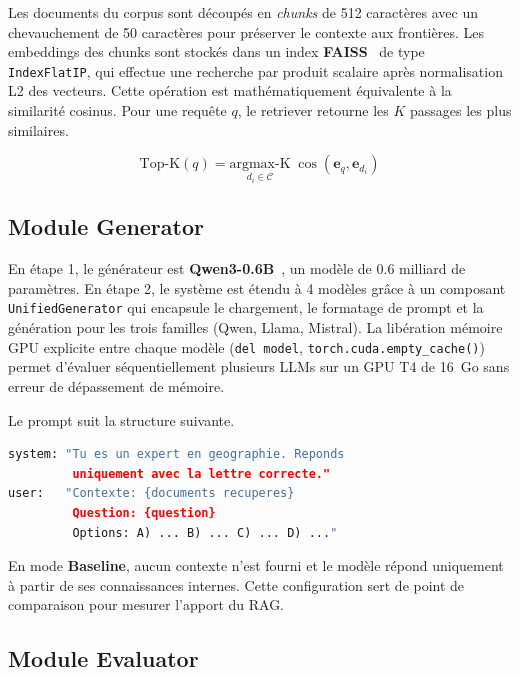 \documentclass[12pt,a4paper]{article}
\begin{document}
Les documents du corpus sont d\'ecoup\'es en \textit{chunks} de 512 caract\`eres avec un chevauchement de 50 caract\`eres pour pr\'eserver le contexte aux fronti\`eres. Les embeddings des chunks sont stock\'es dans un index \textbf{FAISS}~\cite{johnson2019faiss} de type \texttt{IndexFlatIP}, qui effectue une recherche par produit scalaire apr\`es normalisation L2 des vecteurs. Cette op\'eration est math\'ematiquement \'equivalente \`a la similarit\'e cosinus. Pour une requ\^ete $q$, le retriever retourne les $K$ passages les plus similaires.

\begin{equation}
  \text{Top-K}(q) = \underset{d_i \in \mathcal{C}}{\text{argmax-K}} \; \cos(\mathbf{e}_q, \mathbf{e}_{d_i})
\end{equation}

\subsection{Module Generator}

En \'etape 1, le g\'en\'erateur est \textbf{Qwen3-0.6B}~\cite{yang2025qwen3}, un mod\`ele de 0.6 milliard de param\`etres. En \'etape 2, le syst\`eme est \'etendu \`a 4 mod\`eles gr\^ace \`a un composant \texttt{UnifiedGenerator} qui encapsule le chargement, le formatage de prompt et la g\'en\'eration pour les trois familles (Qwen, Llama, Mistral). La lib\'eration m\'emoire GPU explicite entre chaque mod\`ele (\texttt{del model}, \texttt{torch.cuda.empty\_cache()}) permet d'\'evaluer s\'equentiellement plusieurs LLMs sur un GPU T4 de 16~Go sans erreur de d\'epassement de m\'emoire.

Le prompt suit la structure suivante.

\begin{lstlisting}[language=Python, caption={Prompt template pour le mode RAG}]
system: "Tu es un expert en geographie. Reponds
         uniquement avec la lettre correcte."
user:   "Contexte: {documents recuperes}
         Question: {question}
         Options: A) ... B) ... C) ... D) ..."
\end{lstlisting}

En mode \textbf{Baseline}, aucun contexte n'est fourni et le mod\`ele r\'epond uniquement \`a partir de ses connaissances internes. Cette configuration sert de point de comparaison pour mesurer l'apport du RAG.

\subsection{Module Evaluator}
\end{document}
